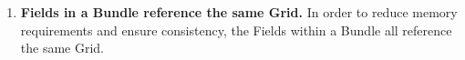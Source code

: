 

\begin{enumerate}

\item{\bf Fields in a Bundle reference the same Grid.}
In order to reduce memory requirements and ensure consistency, the 
Fields within a Bundle all reference the same Grid. 

\end{enumerate}


